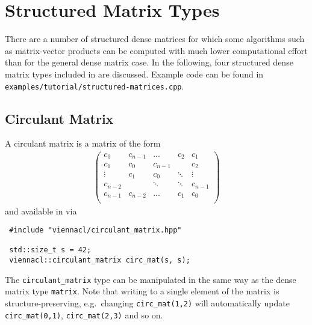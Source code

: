 \chapter{Structured Matrix Types}


There are a number of structured dense matrices for which some algorithms such as matrix-vector products can be computed with much lower computational effort
than for the general dense matrix case. In the following, four structured dense matrix types included in {\ViennaCL} are discussed.
Example code can be found in \lstinline|examples/tutorial/structured-matrices.cpp|.

\section{Circulant Matrix}
A circulant matrix is a matrix of the form
\begin{align*}
 \left( \begin{array}{ccccc}
         c_0 & c_{n-1} & \ldots & c_2 & c_1 \\
         c_1 & c_0 & c_{n-1} & & c_2 \\
         \vdots & c_1 & c_0 & \ddots & \vdots \\
         c_{n-2} & & \ddots & \ddots & c_{n-1} \\
         c_{n-1} & c_{n-2} & \hdots & c_1 & c_0 \\
        \end{array} \right)
\end{align*}
and available in {\ViennaCL} via
\begin{lstlisting}
 #include "viennacl/circulant_matrix.hpp"

 std::size_t s = 42;
 viennacl::circulant_matrix circ_mat(s, s);
\end{lstlisting}
The \lstinline|circulant_matrix| type can be manipulated in the same way as the dense matrix type \lstinline|matrix|. Note that writing to a single element of
the matrix is structure-preserving, e.g.~changing \lstinline|circ_mat(1,2)| will automatically update \lstinline|circ_mat(0,1)|, \lstinline|circ_mat(2,3)| and
so on.


